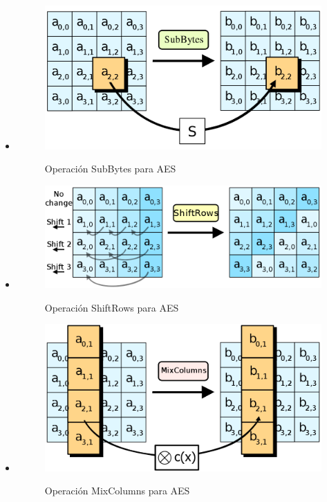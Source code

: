  \begin{itemize}
 \item {}

 \begin{figure}[ht]
   \centering
   \includegraphics[scale=0.3]{Figures/SubBytes}
   \decoRule
   \caption[SubBytes (AES)]{Operación SubBytes para AES} \emph{\parencite{Reference27}}
   \label{fig:SubBytes}
 \end{figure}

 \item {}

 \begin{figure}[ht]
   \centering
   \includegraphics[scale=0.3]{Figures/ShiftRows}
   \decoRule
   \caption[ShiftRows (AES)]{Operación ShiftRows para AES} \emph{\parencite{Reference28}}
   \label{fig:ShiftRows}
 \end{figure}

 \item {}

 \begin{figure}[ht]
   \centering
   \includegraphics[scale=0.3]{Figures/MixColumns}
   \decoRule
   \caption[MixColumns (AES)]{Operación MixColumns para AES} \emph{\parencite{Reference29}}
   \label{fig:MixColumns}
 \end{figure}


\end{itemize}
